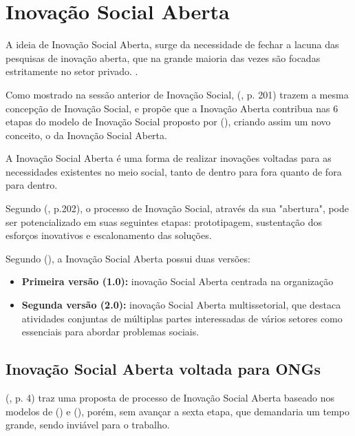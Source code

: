 \section {Inovação Social Aberta}
\label{inovacaosocialaberta}

A ideia de Inovação Social Aberta, surge da necessidade de fechar a lacuna das pesquisas de inovação aberta, que na grande maioria das vezes são focadas estritamente no setor privado. \cite{chesbrough2014}.

Como mostrado na sessão anterior de Inovação Social, \citeauthor{chesbrough2014} (\citeyear{chesbrough2014}, p. 201) trazem a mesma concepção de Inovação Social, e propõe que a Inovação Aberta contribua nas 6 etapas do modelo de Inovação Social proposto por \citeauthor{murray2010} (\citeyear{murray2010}), criando assim um novo conceito, o da Inovação Social Aberta. 

A Inovação Social Aberta é uma forma de realizar inovações voltadas para as necessidades existentes no meio social, tanto de dentro para fora quanto de fora para dentro. 

Segundo \citeauthor{chesbrough2014} (\citeyear{chesbrough2014}, p.202),
o processo de Inovação Social, através da sua "abertura", pode ser potencializado em suas seguintes etapas: prototipagem, sustentação dos esforços inovativos e escalonamento das soluções.
\par\vspace{1\baselineskip}

Segundo \citeauthor{gegenhuber2023} (\citeyear{gegenhuber2023}), a Inovação Social Aberta possui duas versões:
\begin{itemize}
    \item \textbf{Primeira versão (1.0):} inovação Social Aberta centrada na organização
    \item \textbf{Segunda versão (2.0):} inovação Social Aberta multissetorial, que  destaca  atividades  conjuntas  de  múltiplas  partes  interessadas  de  vários  setores  como  essenciais  para  abordar  problemas  sociais.
\end{itemize} 

\subsection{Inovação Social Aberta voltada para ONGs}

\citeauthor{gama2023} (\citeyear{gama2023}, p. 4) traz uma proposta de processo de Inovação Social Aberta baseado nos modelos de \citeauthor{chesbrough2014} (\citeyear{chesbrough2014}) e \citeauthor{murray2010} (\citeyear{murray2010}), porém, sem avançar a sexta etapa, que demandaria um tempo grande, sendo inviável para o trabalho. 

